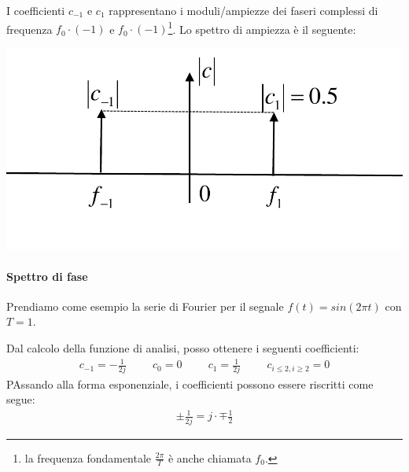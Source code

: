 \documentclass[a4paper, 10pt]{report}
\begin{document}
\begin{center}
\end{center}

\noindent I coefficienti $c_{-1}$ e $c_1$ rappresentano i moduli/ampiezze dei faseri complessi di frequenza $f_0 \cdot (-1)$ e $f_0 \cdot (-1)$\footnote{la frequenza fondamentale $\frac{2 \pi}{T}$ è anche chiamata $f_0$.}. Lo spettro di ampiezza è il seguente:
\begin{center}
\includegraphics[scale=0.4]{6.pdf}
\end{center}

\paragraph*{Spettro di fase} Prendiamo come esempio la serie di Fourier per il segnale $f(t) = sin(2\pi t)$ con $T = 1$.

\noindent Dal calcolo della funzione di analisi, posso ottenere i seguenti coefficienti:
\begin{align*}
c_{-1} = -\frac{1}{2j} \hspace{1cm} c_0 = 0 \hspace{1cm} c_1 = \frac{1}{2j} \hspace{1cm} c_{i \le 2, i \ge 2} = 0
\end{align*}
\noindent PAssando alla forma esponenziale, i coefficienti possono essere riscritti come segue:
\begin{align*}
\pm \frac{1}{2j} =  j \cdot \mp \frac{1}{2}
\end{align*}
\end{document}
